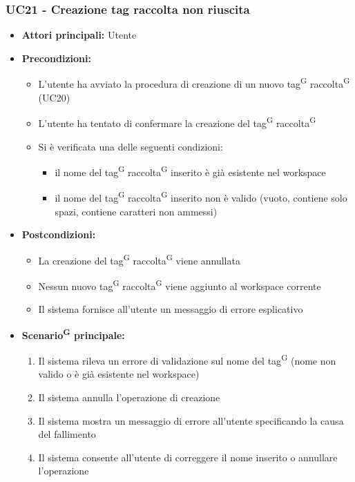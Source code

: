 \documentclass[a4paper, 11pt]{article}
\begin{document}
\subsubsection{UC21 - Creazione tag raccolta non riuscita} \label{UC21}
\begin{itemize}
	\item \textbf{Attori principali:} Utente
	\item \textbf{Precondizioni:} 
	\begin{itemize}
		\item L'utente ha avviato la procedura di creazione di un nuovo tag\textsuperscript{G} raccolta\textsuperscript{G} (UC20)
		\item L'utente ha tentato di confermare la creazione del tag\textsuperscript{G} raccolta\textsuperscript{G}
		\item Si è verificata una delle seguenti condizioni:
		\begin{itemize}
			\item il nome del tag\textsuperscript{G} raccolta\textsuperscript{G} inserito è già esistente nel workspace
			\item il nome del tag\textsuperscript{G} raccolta\textsuperscript{G} inserito non è valido (vuoto, contiene solo spazi, contiene caratteri non ammessi)
		\end{itemize}
	\end{itemize}
	\item \textbf{Postcondizioni:} 
	\begin{itemize}
		\item La creazione del tag\textsuperscript{G} raccolta\textsuperscript{G} viene annullata
		\item Nessun nuovo tag\textsuperscript{G} raccolta\textsuperscript{G} viene aggiunto al workspace corrente
		\item Il sistema fornisce all'utente un messaggio di errore esplicativo
	\end{itemize}
	\item \textbf{Scenario\textsuperscript{G} principale:}
	\begin{enumerate}
		\item Il sistema rileva un errore di validazione sul nome del tag\textsuperscript{G} (nome non valido o è già esistente nel workspace)
		\item Il sistema annulla l'operazione di creazione
		\item Il sistema mostra un messaggio di errore all'utente specificando la causa del fallimento
		\item Il sistema consente all'utente di correggere il nome inserito o annullare l'operazione	
	\end{enumerate}
\end{itemize}
\end{document}
